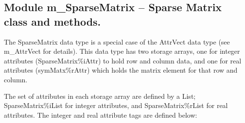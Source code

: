  
\parskip        0pt
\parindent      0pt
\baselineskip  11pt
 
\def\bv{\begin{verbatim}}
\def\ev{\end{verbatim}}
\def\be{\begin{equation}}
\def\ee{\end{equation}}
\def\bea{\begin{eqnarray}}
\def\eea{\end{eqnarray}}
\def\bi{\begin{itemize}}
\def\ei{\end{itemize}}
\def\bn{\begin{enumerate}}
\def\en{\end{enumerate}}
\def\bd{\begin{description}}
\def\ed{\end{description}}
\def\({\left (}
\def\){\right )}
\def\[{\left [}
\def\]{\right ]}
\def\<{\left  \langle}
\def\>{\right \rangle}
\def\cI{{\cal I}}
\def\diag{\mathop{\rm diag}}
\def\tr{\mathop{\rm tr}}
 

 \subsection{Module m\_SparseMatrix -- Sparse Matrix class and methods.}


 
  The SparseMatrix data type is a special case of the  AttrVect data 
  type (see m\_AttrVect for details).  This data type has two storage 
  arrays, one for integer attributes (SparseMatrix\%iAttr) to hold row
  and column data, and one for real attributes (symMatx\%rAttr) which 
  holds the matrix element for that row and column.
 
  The set of attributes in each storage array are defined by a List; 
  SparseMatrix\%iList for integer attributes, and SparseMatrix\%rList 
  for real attributes.  The integer and real attribute tags are defined
  below:
 
